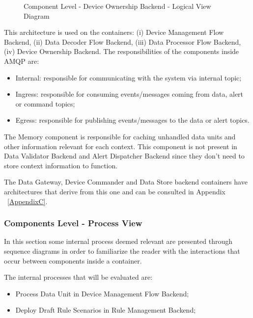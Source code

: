 \begin{figure}[H]
   \centering
   \resizebox{\columnwidth}{!}
   {
      
   }
   \caption[Component Level - Device Ownership Backend - Logical View Diagram]{Component Level - Device Ownership Backend - Logical View Diagram}
   \label{fig:design:architecture:component:logical:diagram:ownership}
\end{figure}

This architecture is used on the containers: (i) Device Management Flow Backend, (ii) Data Decoder Flow Backend, (iii) Data Processor Flow Backend, (iv) Device Ownership Backend. The responsibilities of the components inside AMQP are:

\begin{itemize}
   \item Internal: responsible for communicating with the system via internal topic; 
   \item Ingress: responsible for consuming events/messages coming from data, alert or command topics;
   \item Egress: responsible for publishing events/messages to the data or alert topics.
\end{itemize}

The Memory component is responsible for caching unhandled data units and other information relevant for each context. This component is not present in Data Validator Backend and Alert Dispatcher Backend since they don't need to store context information to function.

The Data Gateway, Device Commander and Data Store backend containers have architectures that derive from this one and can be consulted in Appendix ~\ref{AppendixC}.

\subsubsection*{Components Level - Process View}
\label{subsubsec:design:architecture:components:process}

In this section some internal process deemed relevant are presented through sequence diagrams in order to familiarize the reader with the interactions that occur between components inside a container.

The internal processes that will be evaluated are:

\begin{itemize}
   \item Process Data Unit in Device Management Flow Backend;
   \item Deploy Draft Rule Scenarios in Rule Management Backend;
\end{itemize}

